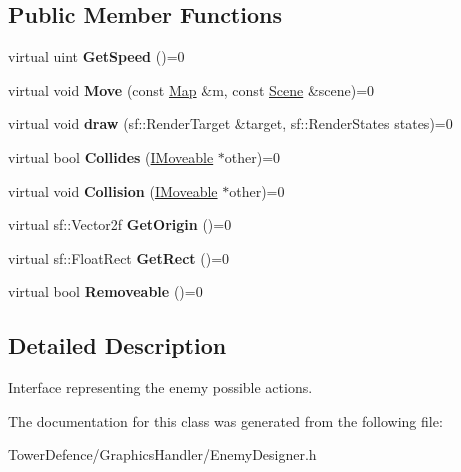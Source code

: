 \subsection*{Public Member Functions}
\begin{DoxyCompactItemize}
\item 
\mbox{\label{class_i_moveable_a66f241a85348b1c9dba3685f277cf9f7}} 
virtual uint {\bfseries Get\+Speed} ()=0
\item 
\mbox{\label{class_i_moveable_acda53a34a5369a696804afd7f88e63d3}} 
virtual void {\bfseries Move} (const \mbox{\hyperlink{class_map}{Map}} \&m, const \mbox{\hyperlink{class_scene}{Scene}} \&scene)=0
\item 
\mbox{\label{class_i_moveable_a7b0625b79748c1642e20d95182c42855}} 
virtual void {\bfseries draw} (sf\+::\+Render\+Target \&target, sf\+::\+Render\+States states)=0
\item 
\mbox{\label{class_i_moveable_aa3b73eabadda4deba75d3e2daceb2e67}} 
virtual bool {\bfseries Collides} (\mbox{\hyperlink{class_i_moveable}{I\+Moveable}} $\ast$other)=0
\item 
\mbox{\label{class_i_moveable_a3e6183140a949499c4e85e4d0d7a771c}} 
virtual void {\bfseries Collision} (\mbox{\hyperlink{class_i_moveable}{I\+Moveable}} $\ast$other)=0
\item 
\mbox{\label{class_i_moveable_a2a8392fa1fe1a22a4f98b2d0ab97a1ff}} 
virtual sf\+::\+Vector2f {\bfseries Get\+Origin} ()=0
\item 
\mbox{\label{class_i_moveable_ade09545d32dc5a0337e15d32ba9f9521}} 
virtual sf\+::\+Float\+Rect {\bfseries Get\+Rect} ()=0
\item 
\mbox{\label{class_i_moveable_ac18bf702bc8c4356f715122270b0e1d5}} 
virtual bool {\bfseries Removeable} ()=0
\end{DoxyCompactItemize}


\subsection{Detailed Description}
Interface representing the enemy possible actions. 

The documentation for this class was generated from the following file\+:\begin{DoxyCompactItemize}
\item 
Tower\+Defence/\+Graphics\+Handler/Enemy\+Designer.\+h\end{DoxyCompactItemize}
